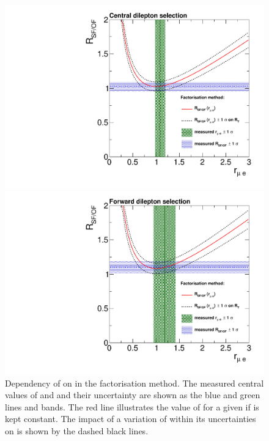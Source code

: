 \begin{figure}[htbp]
\centering
\begin{minipage}[t]{0.49\textwidth}
  \includegraphics[width=\textwidth]{plots/BG/rmue/rMuEPropaganda_central.pdf}
\end{minipage}
\begin{minipage}[t]{0.49\textwidth}
\includegraphics[width=\textwidth]{plots/BG/rmue/rMuEPropaganda_forward.pdf}
\end{minipage}

\caption{Dependency of \Rsfof on \rmue in the factorisation method. The measured central values of \Rsfof and \rmue and their uncertainty are shown as the blue and green lines and bands. The red line illustrates the value of \Rsfof for a given \rmue if \RT is kept constant. The impact of a variation of \RT within its uncertainties on \Rsfof is shown by the dashed black lines.}
\label{fig:rmuePropaganda}
\end{figure} 

